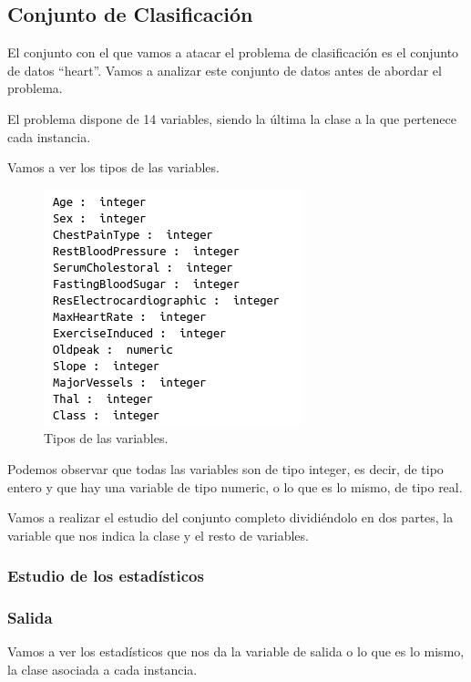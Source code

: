 \documentclass[12pt,a4paper]{article}
\begin{document}
\subsection{Conjunto de Clasificación}

El conjunto con el que vamos a atacar el problema de clasificación es el conjunto de datos ``heart''. Vamos a analizar este conjunto de datos antes de abordar el problema.

El problema dispone de 14 variables, siendo la última la clase a la que pertenece cada instancia.

Vamos a ver los tipos de las variables.

\begin{figure}[H]
	\centering
	\includegraphics[scale=0.7]{./Imagenes/EDA/Clasificacion/tipos_variables.png}
	\caption{Tipos de las variables.}
\end{figure}

Podemos observar que todas las variables son de tipo integer, es decir, de tipo entero y que hay una variable de tipo numeric, o lo que es lo mismo, de tipo real.

Vamos a realizar el estudio del conjunto completo dividiéndolo en dos partes, la variable que nos indica la clase y el resto de variables.

\subsubsection{Estudio de los estadísticos}

\subsubsection*{Salida}

Vamos a ver los estadísticos que nos da la variable de salida o lo que es lo mismo, la clase asociada a cada instancia.
\end{document}
